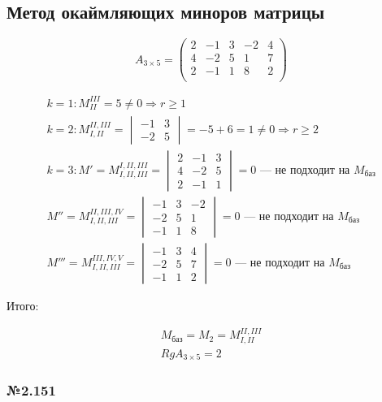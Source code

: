 \documentclass{article}
\begin{document}
\subsection{Метод окаймляющих миноров матрицы}

\[
A_{3 \times 5} = \begin{pmatrix}
	2 & -1 & 3 & -2 & 4 \\
	4 & -2 & 5 & 1 & 7 \\
	2 & -1 & 1 & 8 & 2 \\
\end{pmatrix}
\]

\begin{gather*}
	k = 1: M_{II}^{III} = 5 \ne 0 \Rightarrow r \ge 1 \\
	k = 2: M_{I, II}^{II, III} = \begin{vmatrix}
		-1 & 3 \\
		-2 & 5
	\end{vmatrix} = -5 + 6 = 1 \ne 0 \Rightarrow r \ge 2 \\
	k = 3: M' = M_{I, II, III}^{I, II, III} = \begin{vmatrix}
		2 & -1 & 3 \\
		4 & -2 & 5 \\
		2 & -1 & 1
	\end{vmatrix} = 0 \text{ --- не подходит на $M_\text{баз}$} \\
	M'' = M_{I, II, III}^{II, III, IV} = \begin{vmatrix}
		-1 & 3 & -2 \\
		-2 & 5 & 1 \\
		-1 & 1 & 8
	\end{vmatrix} = 0 \text{ --- не подходит на $M_\text{баз}$} \\
	M''' = M_{I, II, III}^{III, IV, V} = \begin{vmatrix}
		-1 & 3 & 4 \\
		-2 & 5 & 7 \\
		-1 & 1 & 2
	\end{vmatrix} = 0 \text{ --- не подходит на $M_\text{баз}$}
\end{gather*}

Итого:

\begin{gather*}
	M_\text{баз} = M_2 = M_{I, II}^{II, III} \\
	Rg A_{3 \times 5} = 2
\end{gather*}

\subsubsection*{№2.151}
\end{document}
